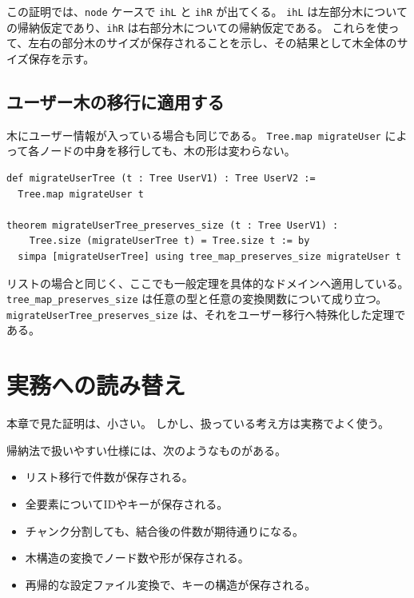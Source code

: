 この証明では、\texttt{node} ケースで \texttt{ihL} と \texttt{ihR} が出てくる。
\texttt{ihL} は左部分木についての帰納仮定であり、\texttt{ihR} は右部分木についての帰納仮定である。
これらを使って、左右の部分木のサイズが保存されることを示し、その結果として木全体のサイズ保存を示す。

\subsection{ユーザー木の移行に適用する}

木にユーザー情報が入っている場合も同じである。
\texttt{Tree.map migrateUser} によって各ノードの中身を移行しても、木の形は変わらない。

\begin{listing}[htbp]
\begin{verbatim}
def migrateUserTree (t : Tree UserV1) : Tree UserV2 :=
  Tree.map migrateUser t

theorem migrateUserTree_preserves_size (t : Tree UserV1) :
    Tree.size (migrateUserTree t) = Tree.size t := by
  simpa [migrateUserTree] using tree_map_preserves_size migrateUser t
\end{verbatim}
\caption{ユーザー木の移行はノード数を保存する}
\label{lst:induction-migrate-tree}
\end{listing}

リストの場合と同じく、ここでも一般定理を具体的なドメインへ適用している。
\texttt{tree\_map\_preserves\_size} は任意の型と任意の変換関数について成り立つ。
\texttt{migrateUserTree\_preserves\_size} は、それをユーザー移行へ特殊化した定理である。

\section{実務への読み替え}

本章で見た証明は、小さい。
しかし、扱っている考え方は実務でよく使う。

\begin{softwarebox}
帰納法で扱いやすい仕様には、次のようなものがある。

\begin{itemize}
\item リスト移行で件数が保存される。
\item 全要素についてIDやキーが保存される。
\item チャンク分割しても、結合後の件数が期待通りになる。
\item 木構造の変換でノード数や形が保存される。
\item 再帰的な設定ファイル変換で、キーの構造が保存される。
\end{itemize}
\end{softwarebox}

